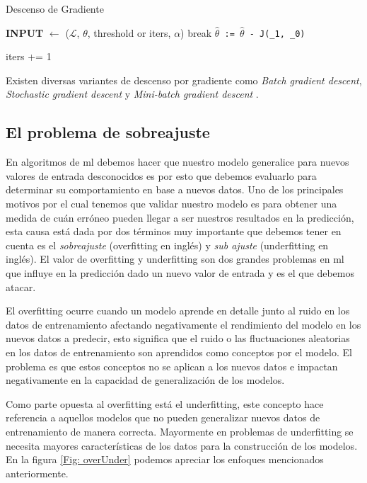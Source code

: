 \begin{algorithm}[H] \caption{Descenso de Gradiente}\label{euclid}
\begin{algorithmic}[1]
\State \textbf{INPUT} $\gets$ ($\mathcal{L}$, $\theta$, threshold or iters, $\alpha$)
	\State	break
\Else
	\State \texttt{$\hat\theta$ := $\hat\theta$ - \alpha \frac{\partial}{\partial \theta} J(\theta_{1}, \theta_{0})}
	
\EndIf
\State iters += 1
\EndWhile
\end{algorithmic}
\end{algorithm}


Existen diversas variantes de descenso por gradiente como \textit{Batch gradient descent}, \textit{Stochastic gradient descent} y \textit{Mini-batch gradient descent} \citep{variants_gd}.

\subsection{El problema de sobreajuste}\label{sub:validacion-modelo}

En algoritmos de \ac{ml} debemos hacer que nuestro modelo generalice para nuevos valores de entrada desconocidos es por esto que debemos evaluarlo para determinar su comportamiento en base a nuevos datos. Uno de los principales motivos por el cual tenemos que validar nuestro modelo es para obtener una medida de cuán erróneo pueden llegar a ser nuestros resultados en la predicción, esta causa está dada por dos términos muy importante que debemos tener en cuenta es el \textit{sobreajuste} (overfitting en inglés) y \textit{sub ajuste} (underfitting en inglés). El valor de overfitting y underfitting son dos grandes problemas en \ac{ml} que influye en la predicción dado un nuevo valor de entrada y es el que debemos atacar. 

El overfitting ocurre cuando un modelo aprende en detalle junto al ruido en los datos de entrenamiento afectando negativamente el rendimiento del modelo en los nuevos datos a predecir, esto significa que el ruido o las fluctuaciones aleatorias en los datos de entrenamiento son aprendidos como conceptos por el modelo. El problema es que estos conceptos no se aplican a los nuevos datos e impactan negativamente en la capacidad de generalización de los modelos.

Como parte opuesta al overfitting está el  underfitting, este concepto hace referencia a aquellos modelos que no pueden generalizar nuevos datos de entrenamiento de manera correcta. Mayormente en problemas de underfitting se necesita mayores características de los datos para la construcción de los modelos. En la figura \ref{Fig: overUnder} podemos apreciar los enfoques mencionados anteriormente.

